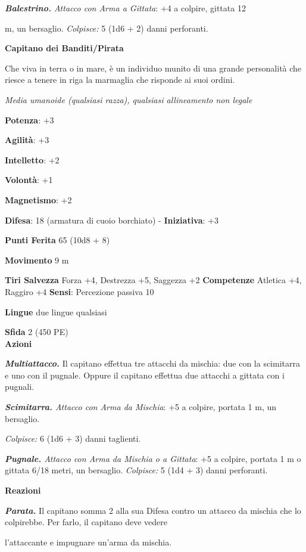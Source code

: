 \begin{multicols}{2}
\emph{\textbf{Balestrino.} Attacco con Arma a Gittata}: +4 a colpire,
gittata 12

m, un bersaglio. \emph{Colpisce:} 5 (1d6 + 2) danni perforanti.



\textbf{Capitano dei Banditi/Pirata}

Che viva in terra o in mare, è un individuo munito di una grande
personalità che riesce a tenere in riga la marmaglia che risponde ai
suoi ordini.

\emph{Media umanoide (qualsiasi razza), qualsiasi allineamento non
legale}

\textbf{Potenza}: +3

\textbf{Agilità}: +3

\textbf{Intelletto}: +2

\textbf{Volontà}: +1

\textbf{Magnetismo}: +2

\textbf{Difesa}: 18 (armatura di cuoio borchiato) - \textbf{Iniziativa}: +3

\textbf{Punti Ferita} 65 (10d8 + 8)

\textbf{Movimento} 9 m

\textbf{Tiri Salvezza} Forza +4, Destrezza +5, Saggezza +2
\textbf{Competenze} Atletica +4, Raggiro +4 \textbf{Sensi}: Percezione
passiva 10

\textbf{Lingue} due lingue qualsiasi

\textbf{Sfida} 2 (450 PE)\smallskip\\

\smallskip\textbf{Azioni}

\emph{\textbf{Multiattacco.}} Il capitano effettua tre attacchi da
mischia: due con la scimitarra e uno con il pugnale. Oppure il capitano
effettua due attacchi a gittata con i pugnali.

\emph{\textbf{Scimitarra.} Attacco con Arma da Mischia}: +5 a colpire,
portata 1 m, un bersaglio.

\emph{Colpisce:} 6 (1d6 + 3) danni taglienti.

\emph{\textbf{Pugnale.} Attacco con Arma da Mischia o a Gittata}: +5 a
colpire, portata 1 m o gittata 6/18 metri, un bersaglio.
\emph{Colpisce:} 5 (1d4 + 3) danni perforanti.

\textbf{Reazioni}

\emph{\textbf{Parata.}} Il capitano somma 2 alla sua Difesa contro un
attacco da mischia che lo colpirebbe. Per farlo, il capitano deve vedere

l'attaccante e impugnare un'arma da mischia.


\end{multicols}
